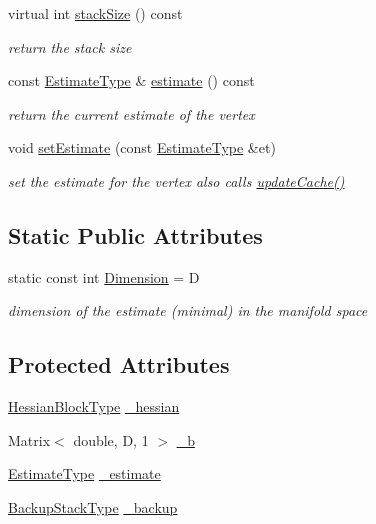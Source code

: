 \begin{DoxyCompactItemize}
virtual int \mbox{\hyperlink{classg2o_1_1_base_vertex_a7d82f4b9669dd123ac7d38c7f4345d8c}{stack\+Size}} () const
\begin{DoxyCompactList}\small\item\em return the stack size \end{DoxyCompactList}\item 
const \mbox{\hyperlink{classg2o_1_1_base_vertex_aaffb179a0d591da4769ec7c3fc7f7daa}{Estimate\+Type}} \& \mbox{\hyperlink{classg2o_1_1_base_vertex_afea20bbcf50eb2a7d9d598b3eae49172}{estimate}} () const
\begin{DoxyCompactList}\small\item\em return the current estimate of the vertex \end{DoxyCompactList}\item 
void \mbox{\hyperlink{classg2o_1_1_base_vertex_acb6e8e8f39caa04f62dd93a3dd400e06}{set\+Estimate}} (const \mbox{\hyperlink{classg2o_1_1_base_vertex_aaffb179a0d591da4769ec7c3fc7f7daa}{Estimate\+Type}} \&et)
\begin{DoxyCompactList}\small\item\em set the estimate for the vertex also calls \mbox{\hyperlink{classg2o_1_1_optimizable_graph_1_1_vertex_ab5972c8ba6834c4dcb8a2319e9bf3070}{update\+Cache()}} \end{DoxyCompactList}\end{DoxyCompactItemize}
\subsection*{Static Public Attributes}
\begin{DoxyCompactItemize}
\item 
static const int \mbox{\hyperlink{classg2o_1_1_base_vertex_a9a831bfdf84cfe625d8f942bc4f1c2d1}{Dimension}} = D
\begin{DoxyCompactList}\small\item\em dimension of the estimate (minimal) in the manifold space \end{DoxyCompactList}\end{DoxyCompactItemize}
\subsection*{Protected Attributes}
\begin{DoxyCompactItemize}
\item 
\mbox{\hyperlink{classg2o_1_1_base_vertex_a887928bc60710e0ec9acb269ee7411db}{Hessian\+Block\+Type}} \mbox{\hyperlink{classg2o_1_1_base_vertex_afaf73b0e874db76655d90bdb2f156c00}{\+\_\+hessian}}
\item 
Matrix$<$ double, D, 1 $>$ \mbox{\hyperlink{classg2o_1_1_base_vertex_a70c672f2997275927efa49c1f5b18ac3}{\+\_\+b}}
\item 
\mbox{\hyperlink{classg2o_1_1_base_vertex_aaffb179a0d591da4769ec7c3fc7f7daa}{Estimate\+Type}} \mbox{\hyperlink{classg2o_1_1_base_vertex_ab188c92c3e906c6e06507ae624c0e7ac}{\+\_\+estimate}}
\item 
\mbox{\hyperlink{classg2o_1_1_base_vertex_ae6632291d46b458196bdb021a6c8cba1}{Backup\+Stack\+Type}} \mbox{\hyperlink{classg2o_1_1_base_vertex_a936082916993857a77c8318bc3e59d23}{\+\_\+backup}}
\end{DoxyCompactItemize}
